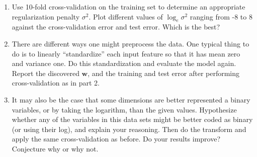 \documentclass[submit]{harvardml}
\newcommand{\bw}{\mathbf{w}}
\begin{document}
\begin{problem}
\begin{enumerate}
  \item Use
    10-fold cross-validation on the training set to determine an appropriate regularization
    penalty $\sigma^2$.  Plot different values of $\log_e \sigma^2$ ranging from -8 to 8  against the cross-validation error and test error.  Which is the best?
  \item There are different ways one might preprocess the data.  One
    typical thing to do is to linearly ``standardize'' each input feature so
    that it has mean zero and variance one.  Do this standardization
    and evaluate the model again.  Report the discovered $\bw$, and the training and test error after performing cross-validation as in part 2.
    \item It may also be the case that some dimensions are better represented a binary variables, or by taking the logarithm, than the given values.
  Hypothesize whether any of the variables in this data sets might be better coded as binary (or using their log), and explain your reasoning.
  Then do the transform and apply the same cross-validation as before.  Do your results improve?  Conjecture why or why not.
\end{enumerate}
\end{problem}
\end{document}
